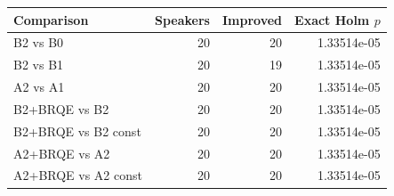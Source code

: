 \begin{tabular}{lrrr}
\toprule
Comparison & Speakers & Improved & Exact Holm $p$ \\
\midrule
B2 vs B0 & 20 & 20 & 1.33514e-05 \\
B2 vs B1 & 20 & 19 & 1.33514e-05 \\
A2 vs A1 & 20 & 20 & 1.33514e-05 \\
B2+BRQE vs B2 & 20 & 20 & 1.33514e-05 \\
B2+BRQE vs B2 const & 20 & 20 & 1.33514e-05 \\
A2+BRQE vs A2 & 20 & 20 & 1.33514e-05 \\
A2+BRQE vs A2 const & 20 & 20 & 1.33514e-05 \\
\bottomrule
\end{tabular}
